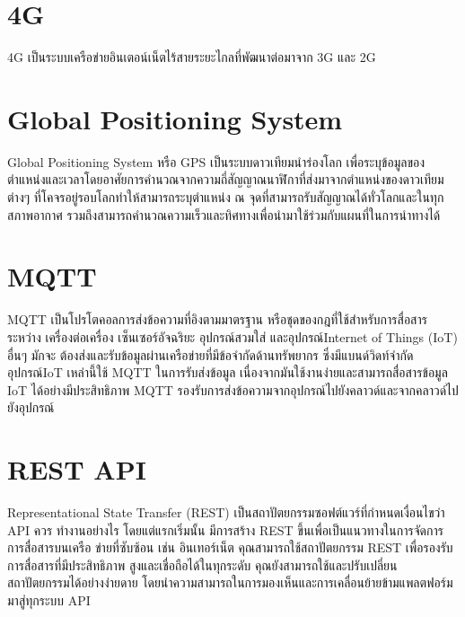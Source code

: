 \section{4G}
4G เป็นระบบเครือข่ายอินเตอน์เน็ตไร้สายระยะไกลที่พัฒนาต่อมาจาก 3G และ 2G

\section{Global Positioning System}
Global Positioning System หรือ GPS เป็นระบบดาวเทียมนำร่องโลก เพื่อระบุข้อมูลของตำแหน่งและเวลาโดยอาศัยการคำนวณจากความถี่สัญญาณนาฬิกาที่ส่งมาจากตำแหน่งของดาวเทียมต่างๆ ที่โคจรอยู่รอบโลกทำให้สามารถระบุตำแหน่ง ณ จุดที่สามารถรับสัญญาณได้ทั่วโลกและในทุกสภาพอากาศ รวมถึงสามารถคำนวณความเร็วและทิศทางเพื่อนำมาใช้ร่วมกับแผนที่ในการนำทางได้





\section{MQTT}
MQTT เป็นโปรโตคอลการส่งข้อความที่อิงตามมาตรฐาน หรือชุดของกฎที่ใช้สําหรับการสื่อสารระหว่าง เครื่องต่อเครื่อง เซ็นเซอร์อัจฉริยะ อุปกรณ์สวมใส่ และอุปกรณ์Internet of Things (IoT) อื่นๆ มักจะ ต้องส่งและรับข้อมูลผ่านเครือข่ายที่มีข้อจํากัดด้านทรัพยากร ซึ่งมีแบนด์วิดท์จํากัด อุปกรณ์IoT เหล่านี้ใช้ MQTT ในการรับส่งข้อมูล เนื่องจากมันใช้งานง่ายและสามารถสื่อสารข้อมูล IoT ได้อย่างมีประสิทธิภาพ MQTT รองรับการส่งข้อความจากอุปกรณ์ไปยังคลาวด์และจากคลาวด์ไปยังอุปกรณ์

\section{REST API}
Representational State Transfer (REST) เป็นสถาปัตยกรรมซอฟต์แวร์ที่กําหนดเงื่อนไขว่า API ควร ทํางานอย่างไร โดยแต่แรกเริ่มนั้น มีการสร้าง REST ขึ้นเพื่อเป็นแนวทางในการจัดการการสื่อสารบนเครือ ข่ายที่ซับซ้อน เช่น อินเทอร์เน็ต คุณสามารถใช้สถาปัตยกรรม REST เพื่อรองรับการสื่อสารที่มีประสิทธิภาพ สูงและเชื่อถือได้ในทุกระดับ คุณยังสามารถใช้และปรับเปลี่ยนสถาปัตยกรรมได้อย่างง่ายดาย โดยนําความสามารถในการมองเห็นและการเคลื่อนย้ายข้ามแพลตฟอร์มมาสู่ทุกระบบ API

